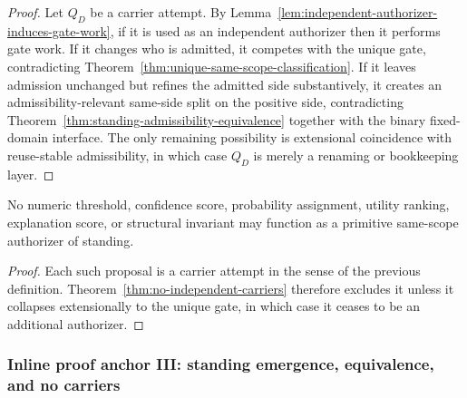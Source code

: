 \begin{proof}
Let $Q_D$ be a carrier attempt. By Lemma~\ref{lem:independent-authorizer-induces-gate-work}, if it is used as an independent authorizer then it performs gate work. If it changes who is admitted, it competes with the unique gate, contradicting Theorem~\ref{thm:unique-same-scope-classification}. If it leaves admission unchanged but refines the admitted side substantively, it creates an admissibility-relevant same-side split on the positive side, contradicting Theorem~\ref{thm:standing-admissibility-equivalence} together with the binary fixed-domain interface. The only remaining possibility is extensional coincidence with reuse-stable admissibility, in which case $Q_D$ is merely a renaming or bookkeeping layer.\cite{MaleyNecessity,MaleyUnus}
\end{proof}

\begin{corollary}
No numeric threshold, confidence score, probability assignment, utility ranking, explanation score, or structural invariant may function as a primitive same-scope authorizer of standing.
\end{corollary}

\begin{proof}
Each such proposal is a carrier attempt in the sense of the previous definition. Theorem~\ref{thm:no-independent-carriers} therefore excludes it unless it collapses extensionally to the unique gate, in which case it ceases to be an additional authorizer.\cite{MaleyNecessity,MaleyUnus}
\end{proof}

\subsubsection*{Inline proof anchor III: standing emergence, equivalence, and no carriers}

